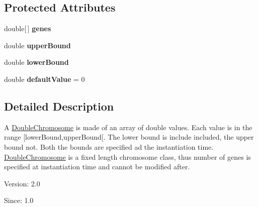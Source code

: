 \subsection*{Protected Attributes}
\begin{CompactItemize}
\item 
\hypertarget{classjenes_1_1chromosome_1_1_double_chromosome_0a987b7f1fa1c4cec652330ad77b6ba6}{
double\mbox{[}$\,$\mbox{]} \textbf{genes}}
\label{classjenes_1_1chromosome_1_1_double_chromosome_0a987b7f1fa1c4cec652330ad77b6ba6}

\item 
\hypertarget{classjenes_1_1chromosome_1_1_double_chromosome_56362107033b220e75d83b75ea91b74e}{
double \textbf{upperBound}}
\label{classjenes_1_1chromosome_1_1_double_chromosome_56362107033b220e75d83b75ea91b74e}

\item 
\hypertarget{classjenes_1_1chromosome_1_1_double_chromosome_f7c35ef9163f9ea35beb27b2c5985aa4}{
double \textbf{lowerBound}}
\label{classjenes_1_1chromosome_1_1_double_chromosome_f7c35ef9163f9ea35beb27b2c5985aa4}

\item 
\hypertarget{classjenes_1_1chromosome_1_1_double_chromosome_5c2d56f7d05b08c75013a7529ae46839}{
double \textbf{defaultValue} = 0}
\label{classjenes_1_1chromosome_1_1_double_chromosome_5c2d56f7d05b08c75013a7529ae46839}

\end{CompactItemize}


\subsection{Detailed Description}
A \hyperlink{classjenes_1_1chromosome_1_1_double_chromosome}{DoubleChromosome} is made of an array of double values. Each value is in the range \mbox{[}lowerBound,upperBound\mbox{[}. The lower bound is include included, the upper bound not. Both the bounds are specified ad the instantiation time. \hyperlink{classjenes_1_1chromosome_1_1_double_chromosome}{DoubleChromosome} is a fixed length chromosome class, thus number of genes is specified at instantiation time and cannot be modified after.

\begin{Desc}
\item[Version:]2.0 \end{Desc}
\begin{Desc}
\item[Since:]1.0 \end{Desc}


